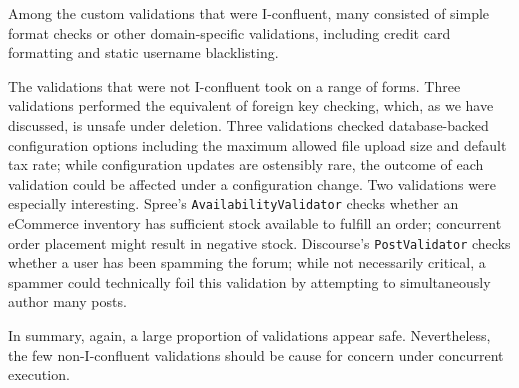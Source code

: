 Among the custom validations that were I-confluent, many consisted of
simple format checks or other domain-specific validations, including
credit card formatting and static username blacklisting.

The validations that were not I-confluent took on a range of
forms. Three validations performed the equivalent of foreign key
checking, which, as we have discussed, is unsafe under deletion. Three
validations checked database-backed configuration options including
the maximum allowed file upload size and default tax rate; while
configuration updates are ostensibly rare, the outcome of each
validation could be affected under a configuration change. Two
validations were especially interesting. Spree's
\texttt{AvailabilityValidator} checks whether an eCommerce inventory
has sufficient stock available to fulfill an order; concurrent order
placement might result in negative stock. Discourse's
\texttt{PostValidator} checks whether a user has been spamming the
forum; while not necessarily critical, a spammer could technically
foil this validation by attempting to simultaneously author many posts.

In summary, again, a large proportion of validations appear
safe. Nevertheless, the few non-I-confluent validations should be
cause for concern under concurrent execution.


